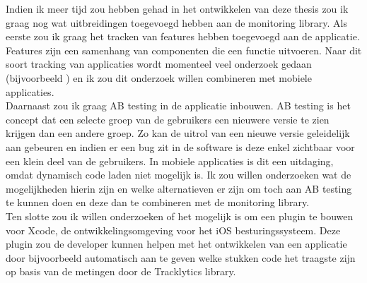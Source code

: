 Indien ik meer tijd zou hebben gehad in het ontwikkelen van deze thesis zou ik graag nog wat uitbreidingen toegevoegd hebben aan de monitoring library. Als eerste zou ik graag het tracken van features hebben toegevoegd aan de applicatie. Features zijn een samenhang van componenten die een functie uitvoeren. Naar dit soort tracking van applicaties wordt momenteel veel onderzoek gedaan (bijvoorbeeld \cite{fischer2003analyzing}) en ik zou dit onderzoek willen combineren met mobiele applicaties. \\
Daarnaast zou ik graag AB testing in de applicatie inbouwen. AB testing is het concept dat een selecte groep van de gebruikers een nieuwere versie te zien krijgen dan een andere groep. Zo kan de uitrol van een nieuwe versie geleidelijk aan gebeuren en indien er een bug zit in de software is deze enkel zichtbaar voor een klein deel van de gebruikers. In mobiele applicaties is dit een uitdaging, omdat dynamisch code laden niet mogelijk is. Ik zou willen onderzoeken wat de mogelijkheden hierin zijn en welke alternatieven er zijn om toch aan AB testing te kunnen doen en deze dan te combineren met de monitoring library.\\
Ten slotte zou ik willen onderzoeken of het mogelijk is om een plugin te bouwen voor Xcode, de ontwikkelingsomgeving voor het iOS besturingssysteem. Deze plugin zou de developer kunnen helpen met het ontwikkelen van een applicatie door bijvoorbeeld automatisch aan te geven welke stukken code het traagste zijn op basis van de metingen door de Tracklytics library. \\
 
